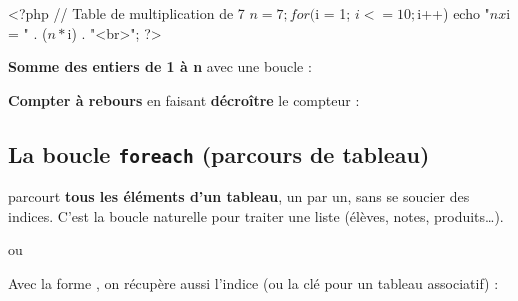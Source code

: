 \begin{codephp}
<?php
  // Table de multiplication de 7
  $n = 7;
  for ($i = 1; $i <= 10; $i++) {
    echo "$n x $i = " . ($n * $i) . "<br>";
  }
?>
\end{codephp}


\begin{exemple}
\textbf{Somme des entiers de 1 à n} avec une boucle  :
\end{exemple}

\begin{exemple}
\textbf{Compter à rebours} en faisant \textbf{décroître} le compteur :
\end{exemple}

\subsection{La boucle \texttt{foreach} (parcours de tableau)}

\begin{definition}
 parcourt \textbf{tous les éléments d'un tableau}, un par un, sans se
soucier des indices. C'est la boucle naturelle pour traiter une liste (élèves,
notes, produits\dots).
\end{definition}

\begin{syntaxe}
 \quad ou \\
\end{syntaxe}


Avec la forme , on récupère aussi l'indice (ou la clé pour
un tableau associatif) :

